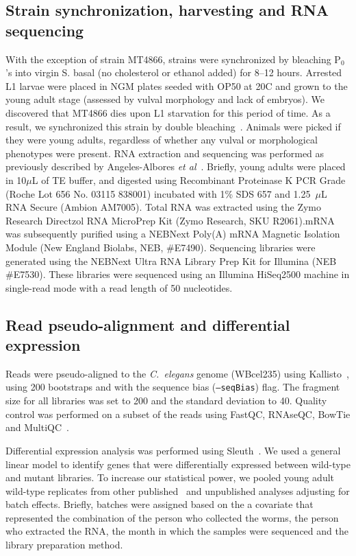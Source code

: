 \documentclass[8pt, twocolumn]{article}
\newcommand{\cel}{\emph{C.~elegans}}
\begin{document}
\subsection*{Strain synchronization, harvesting and RNA sequencing}
With the exception of strain MT4866, strains were synchronized by bleaching
P$_0$'s into virgin S. basal (no cholesterol or ethanol added) for 8--12 hours.
Arrested L1 larvae were placed in NGM plates seeded with OP50 at 20\degree{}C
and grown to the young adult stage (assessed by vulval morphology and lack of
embryos). We discovered that MT4866 dies upon L1 starvation for this period of
time. As a result, we synchronized this strain by double bleaching~\cite{}.
Animals were picked if they were young adults, regardless of whether any vulval
or morphological phenotypes were present. RNA extraction and sequencing was
performed as previously described by Angeles-Albores \emph{et
al}~\cite{AngelesAlboresHIF, Angeles-Albores2017}. Briefly, young adults were
placed in 10$\mu$L of TE buffer,  and digested using  Recombinant Proteinase K
PCR Grade (Roche Lot 656 No. 03115 838001) incubated with 1\% SDS 657 and
1.25~$\mu$L RNA Secure (Ambion AM7005). Total RNA was extracted using the Zymo
Research Directzol RNA MicroPrep Kit (Zymo Research, SKU R2061).\@ mRNA was
subsequently purified using a NEBNext Poly(A) mRNA Magnetic Isolation Module
(New England Biolabs, NEB, \#E7490). Sequencing libraries were generated using
the NEBNext Ultra RNA Library Prep Kit for Illumina (NEB \#E7530). These
libraries were sequenced using an Illumina HiSeq2500 machine in single-read mode
with a read length of 50 nucleotides.

\subsection*{Read pseudo-alignment and differential expression}
Reads were pseudo-aligned to the \cel{} genome (WBcel235) using
Kallisto~\cite{Bray2016}, using 200 bootstraps and with the sequence bias
(\texttt{--seqBias}) flag. The fragment size for all libraries was set to 200
and the standard deviation to 40. Quality control was performed on a subset of
the reads using FastQC, RNAseQC, BowTie and
MultiQC~\cite{Andrews2010,Deluca2012,Langmead2009,Ewels2016}.

Differential expression analysis was performed using
Sleuth~\cite{Pimentel2016a}. We used a general linear model to identify genes
that were differentially expressed between wild-type and mutant libraries. To
increase our statistical power, we pooled young adult wild-type replicates from
other published~\cite{AngelesAlboresHIF,Angeles-Albores2017} and unpublished
analyses adjusting for batch effects. Briefly, batches were assigned based on
the a covariate that represented the combination of the person who collected the
worms, the person who extracted the RNA, the month in which the samples were
sequenced and the library preparation method.
\end{document}
